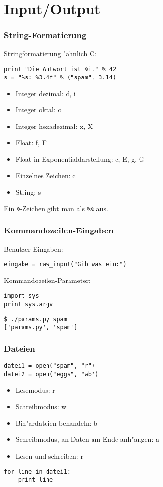 \section{Input/Output}

\begin{frame}[fragile]
\frametitle{String-Formatierung}
Stringformatierung "ahnlich C: 
\begin{lstlisting}[style=Python]
print "Die Antwort ist %i." % 42
s = "%s: %3.4f" % ("spam", 3.14)
\end{lstlisting}
\begin{itemize}
\item Integer dezimal: d, i
\item Integer oktal: o
\item Integer hexadezimal: x, X
\item Float: f, F
\item Float in Exponentialdarstellung: e, E, g, G
\item Einzelnes Zeichen: c
\item String: s
\end{itemize}
Ein \texttt{\%}-Zeichen gibt man als \texttt{\%\%} aus.
\end{frame}

\begin{frame}[fragile]
\frametitle{Kommandozeilen-Eingaben}
Benutzer-Eingaben:
\begin{lstlisting}[style=Python]
eingabe = raw_input("Gib was ein:")
\end{lstlisting}
\vspace{3mm}
Kommandozeilen-Parameter:
\begin{lstlisting}[style=Python]
import sys
print sys.argv
\end{lstlisting}
\begin{lstlisting}[style=Shell]
$ ./params.py spam
['params.py', 'spam']
\end{lstlisting} %
\end{frame}

\begin{frame}[fragile]
\frametitle{Dateien}
\begin{lstlisting}[style=Python]
datei1 = open("spam", "r")
datei2 = open("eggs", "wb")
\end{lstlisting}
\begin{itemize}
\item Lesemodus: r
\item Schreibmodus: w
\item Bin"ardateien behandeln: b
\item Schreibmodus, an Daten am Ende anh"angen: a
\item Lesen und schreiben: r+
\end{itemize}
\begin{lstlisting}
for line in datei1:
    print line
\end{lstlisting}
\end{frame}

